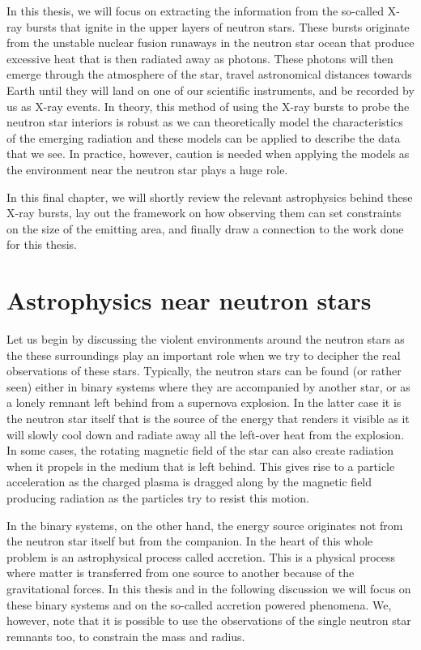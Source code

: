 In this thesis, we will focus on extracting the information from the so-called X-ray bursts that ignite in the upper layers of neutron stars.
These bursts originate from the unstable nuclear fusion runaways in the neutron star ocean that produce excessive heat that is then radiated away as photons.
These photons will then emerge through the atmosphere of the star, travel astronomical distances towards Earth until they will land on one of our scientific instruments, and be recorded by us as X-ray events.
In theory, this method of using the X-ray bursts to probe the neutron star interiors is robust as we can theoretically model the characteristics of the emerging radiation and these models can be applied to describe the data that we see. 
In practice, however, caution is needed when applying the models as the environment near the neutron star plays a huge role.

In this final chapter, we will shortly review the relevant astrophysics behind these X-ray bursts, lay out the framework on how observing them can set constraints on the size of the emitting area, and finally draw a connection to the work done for this thesis.


\section{Astrophysics near neutron stars}
Let us begin by discussing the violent environments around the neutron stars as the these surroundings play an important role when we try to decipher the real observations of these stars.
Typically, the neutron stars can be found (or rather seen) either in binary systems where they are accompanied by another star, or as a lonely remnant left behind from a supernova explosion.
In the latter case it is the neutron star itself that is the source of the energy that renders it visible as it will slowly cool down and radiate away all the left-over heat from the explosion.
In some cases, the rotating magnetic field of the star can also create radiation when it propels in the medium that is left behind.
This gives rise to a particle acceleration as the charged plasma is dragged along by the magnetic field producing radiation as the particles try to resist this motion.


In the binary systems, on the other hand, the energy source originates not from the neutron star itself but from the companion.
In the heart of this whole problem is an astrophysical process called accretion.
This is a physical process where matter is transferred from one source to another because of the gravitational forces.
In this thesis and in the following discussion we will focus on these binary systems and on the so-called accretion powered phenomena.
We, however, note that it is possible to use the observations of the single neutron star remnants too, to constrain the mass and radius.\cite[see, e.g.,][]{PR06}


